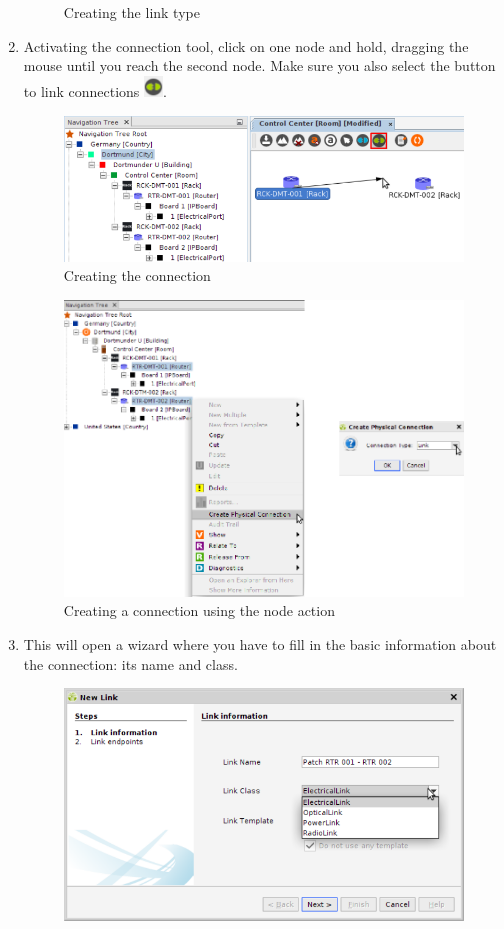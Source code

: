 \documentclass[a4paper]{article}
\begin{document}
\begin{enumerate}
\begin{figure}[h!]
					\caption{Creating the link type}
					\label{fig:l1_example_1_electrical_link_type}
				\end{figure}
				\item Activating the connection tool, click on one node and hold, dragging the mouse until you reach the second node. Make sure you also select the button to link connections \includegraphics[width=0.5cm]{img/object_view_link.png}.
				\begin{figure}[h!]
					\centering
					\includegraphics[width=0.8\linewidth]{img/l1_example_1_new_connection.png}
					\caption{Creating the connection}
					\label{fig:l1_example_1_new_connection}
				\end{figure}
				\begin{figure}[h!]
					\centering
					\includegraphics[width=0.7\linewidth]{img/actions_create_connection_link.png}
					\caption{Creating a connection using the node action}
					\label{fig:actions_create_connection_link}
				\end{figure}
				\item This will open a wizard where you have to fill in the basic information about the connection: its name and class.
				\begin{figure}[h!]
					\centering
					\includegraphics[width=0.8\linewidth]{img/l1_example_1_link_wizard.png}

\end{figure}
\end{enumerate}
\end{document}
